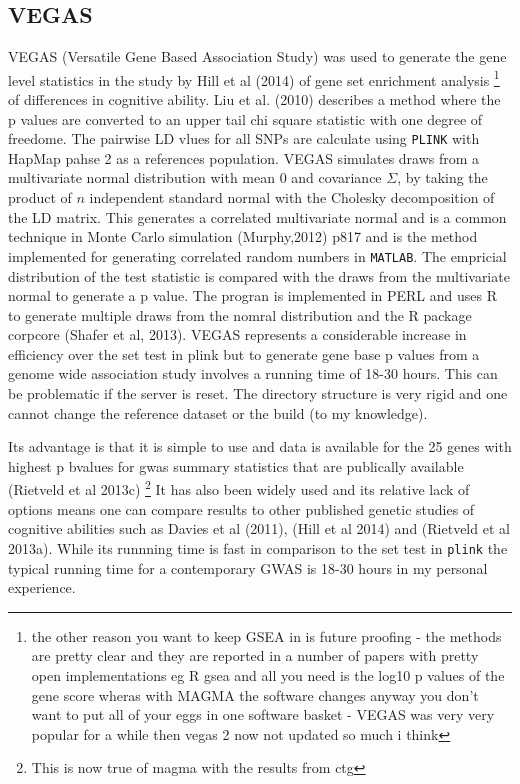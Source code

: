 \subsection{VEGAS}
VEGAS (Versatile Gene Based Association Study) was used to generate the gene level statistics in the study by Hill et al (2014) of gene set enrichment analysis \footnote{the other reason you want to keep GSEA in is future proofing - the methods are pretty clear and they are reported in a number of papers with pretty open implementations eg R gsea and all you need is the log10 p values of the gene score wheras with MAGMA the software changes anyway you don't want to put all of your eggs in one software basket - VEGAS was very very popular for a while then vegas 2 now not updated so much i think} of differences in cognitive ability. Liu et al. (2010) describes a method where the p values are converted to an upper tail chi square statistic with one degree of freedome. The pairwise LD vlues for all SNPs are calculate using \texttt{PLINK} with HapMap pahse 2 as a references population. VEGAS simulates draws from a multivariate normal distribution with mean 0 and covariance $\Sigma$, by taking the product of $n$ independent standard normal with the Cholesky decomposition of the LD matrix. This generates a correlated multivariate normal and is a common technique in Monte Carlo simulation (Murphy,2012) p817 and is the method implemented for generating correlated random numbers in \texttt{MATLAB}. The empricial distribution of the test statistic is compared with the draws from the multivariate normal to generate a p value. The progran is implemented in PERL and uses R to generate multiple draws from the nomral distribution and the R package corpcore (Shafer et al, 2013).
VEGAS represents a considerable increase in efficiency over the set test in plink but to generate gene base p values from a genome wide association study involves a running time of 18-30 hours. This can be problematic if the server is reset. The directory structure is very rigid and one cannot change the reference dataset or the build (to my knowledge). 

Its advantage is that it is simple to use and data is available for the 25 genes with highest p bvalues for gwas summary statistics that are publically available (Rietveld et al 2013c) \footnote{This is now true of magma with the results from ctg} It has also been widely used and its relative lack of options means one can compare results to other published genetic studies of cognitive abilities such as Davies et al (2011), (Hill et al 2014) and (Rietveld et al 2013a). While its runnning time is fast in comparison to the set test in \texttt{plink} the typical running time for a contemporary GWAS is 18-30 hours in my personal experience.

